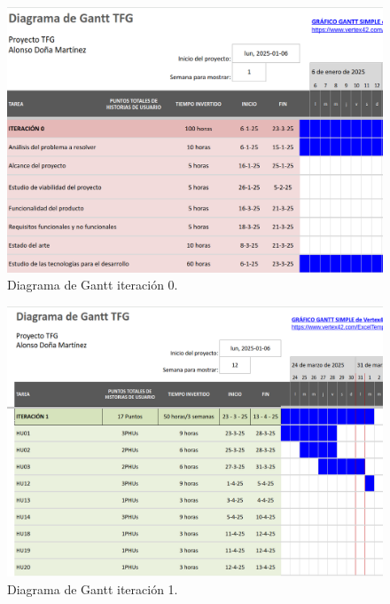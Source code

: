 \begin{figure}[H]
    \centering
    \includegraphics[width=1\textwidth]{fotos/iter0.png}
    \caption{Diagrama de Gantt iteración 0\textbf{}.}
    \label{fig:gantt0}
\end{figure}
\begin{figure}[H]
    \centering
    \includegraphics[width=1\textwidth]{fotos/iter1.png}
    \caption{Diagrama de Gantt iteración 1\textbf{}.}
    \label{fig:gantt1}
\end{figure}
